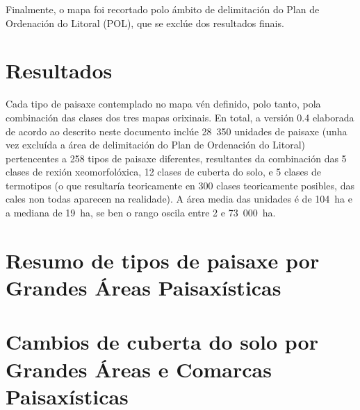 \documentclass[11pt,a4paper]{article}
\begin{document}
Finalmente, o mapa foi recortado polo ámbito de delimitación do Plan de Ordenación do Litoral (POL), que se exclúe dos resultados finais.



\section{Resultados}

Cada tipo de paisaxe contemplado no mapa vén definido, polo tanto, pola combinación das clases dos tres mapas orixinais. En total, a versión 0.4 elaborada de acordo ao descrito neste documento inclúe 28~350 unidades de paisaxe (unha vez excluída a área de delimitación do Plan de Ordenación do Litoral) pertencentes a 258 tipos de paisaxe diferentes, resultantes da combinación das 5 clases de rexión xeomorfolóxica, 12 clases de cuberta do solo, e 5 clases de termotipos (o que resultaría teoricamente en 300 clases teoricamente posibles, das cales non todas aparecen na realidade). A área media das unidades é de 104~ha e a mediana de 19~ha, se ben o rango oscila entre 2 e 73~000~ha.








\newpage
\section*{Resumo de tipos de paisaxe por Grandes Áreas Paisaxísticas}

\begin{landscape}
 \begin{small}
  
  
 \end{small}
\clearpage
\end{landscape}


\section*{Cambios de cuberta do solo por Grandes Áreas e Comarcas Paisaxísticas}
\end{document}
